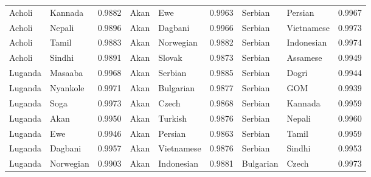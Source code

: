 \documentclass[11pt]{article} %
\begin{document}
\begin{table}
\begin{tabular}{llr@{\hspace{12pt}}llr@{\hspace{12pt}}llr}
            Acholi                       & Kannada             & 0.9882        & Akan                & Ewe                 & 0.9963        & Serbian             & Persian             & 0.9967        \\
            Acholi                       & Nepali              & 0.9896        & Akan                & Dagbani             & 0.9966        & Serbian             & Vietnamese          & 0.9973        \\
            Acholi                       & Tamil               & 0.9883        & Akan                & Norwegian           & 0.9882        & Serbian             & Indonesian          & 0.9974        \\
            Acholi                       & Sindhi              & 0.9891        & Akan                & Slovak              & 0.9873        & Serbian             & Assamese            & 0.9949        \\
            Luganda                      & Masaaba             & 0.9968        & Akan                & Serbian             & 0.9885        & Serbian             & Dogri               & 0.9944        \\
            Luganda                      & Nyankole            & 0.9971        & Akan                & Bulgarian           & 0.9877        & Serbian             & GOM                 & 0.9939        \\
            Luganda                      & Soga                & 0.9973        & Akan                & Czech               & 0.9868        & Serbian             & Kannada             & 0.9959        \\
            Luganda                      & Akan                & 0.9950        & Akan                & Turkish             & 0.9876        & Serbian             & Nepali              & 0.9960        \\
            Luganda                      & Ewe                 & 0.9946        & Akan                & Persian             & 0.9863        & Serbian             & Tamil               & 0.9959        \\
            Luganda                      & Dagbani             & 0.9957        & Akan                & Vietnamese          & 0.9876        & Serbian             & Sindhi              & 0.9953        \\
            Luganda                      & Norwegian           & 0.9903        & Akan                & Indonesian          & 0.9881        & Bulgarian           & Czech               & 0.9973        \\

\end{tabular}
\end{table}
\end{document}
